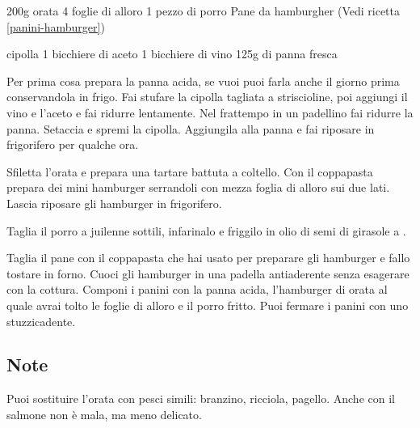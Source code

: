 \begin{ingreds}
	200g orata 
	4 foglie di alloro 
	1 pezzo di porro 
	Pane da hamburgher (Vedi ricetta \ref{panini-hamburger})
	
\columnbreak
{} cipolla
	1 bicchiere di aceto
	1 bicchiere di vino
	125g di panna fresca
\end{ingreds}

\begin{method}
Per prima cosa prepara la panna acida, se vuoi puoi farla anche il giorno prima conservandola in frigo. Fai stufare la cipolla tagliata a striscioline, poi aggiungi il vino e l'aceto e fai ridurre lentamente. Nel frattempo in un padellino fai ridurre la panna. Setaccia e spremi la cipolla. Aggiungila alla panna e fai riposare in frigorifero per qualche ora.

Sfiletta l'orata e prepara una tartare battuta a coltello. Con il coppapasta prepara dei mini hamburger serrandoli con mezza foglia di alloro sui due lati. Lascia riposare gli hamburger in frigorifero.

Taglia il porro a juilenne sottili, infarinalo e friggilo in olio di semi di girasole a .

Taglia il pane con il coppapasta che hai usato per preparare gli hamburger e fallo tostare in forno. Cuoci gli hamburger in una padella antiaderente senza esagerare con la cottura. Componi i panini con la panna acida, l'hamburger di orata al quale avrai tolto le foglie di alloro e il porro fritto. Puoi fermare i panini con uno stuzzicadente.
\end{method}
\subsection*{Note}
		Puoi sostituire l'orata con pesci simili: branzino, ricciola, pagello. Anche con il salmone non è mala, ma meno delicato.


